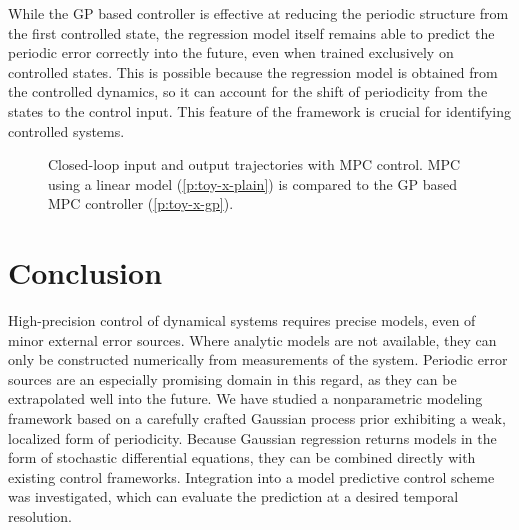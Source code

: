 While the GP based controller is effective at reducing the periodic structure
from the first controlled state, the regression model itself remains able to
predict the periodic error correctly into the future, even when trained
exclusively on controlled states. This is possible because the regression model
is obtained from the controlled dynamics, so it can account for the shift of
periodicity from the states to the control input. This feature of the framework
is crucial for identifying controlled systems.

\begin{figure}
\centering
\footnotesize
{}
\caption[Closed-loop input and output trajectories with MPC
control.]{Closed-loop input and output trajectories with MPC control.
MPC using a linear model (\ref*{p:toy-x-plain}) is compared to the GP based MPC
controller (\ref*{p:toy-x-gp}).}
\label{fig:toy_example}
\end{figure}

\section{Conclusion}

High-precision control of dynamical systems requires precise models, even of
minor external error sources. Where analytic models are not available, they can
only be constructed numerically from measurements of the system. Periodic error
sources are an especially promising domain in this regard, as they can be
extrapolated well into the future. We have studied a nonparametric modeling
framework based on a carefully crafted Gaussian process prior exhibiting a
weak, localized form of periodicity. Because Gaussian regression returns models
in the form of stochastic differential equations, they can be combined directly
with existing control frameworks. Integration into a model predictive control
scheme was investigated, which can evaluate the prediction at a desired temporal
resolution.
